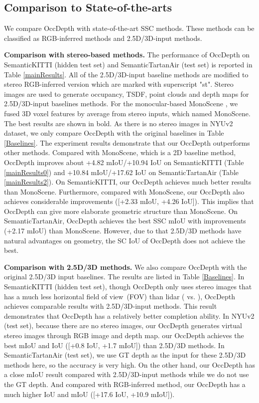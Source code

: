 \documentclass{article}
\begin{document}
	\subsection{Comparison to State-of-the-arts}
	\label{ComparisonSOTA}
	We compare OccDepth with state-of-the-art SSC methods. These methods can be classified as RGB-inferred methods and 2.5D/3D-input methods.

 	\textbf{Comparison with stereo-based methods.} The performance of OccDepth on SemanticKITTI (hidden test set) and SemanticTartanAir (test set) is reported in Table \ref{mainResults}. All of the 2.5D/3D-input baseline methods are modified to stereo RGB-inferred version which are marked with superscript "st". Stereo images are used to generate occupancy, TSDF, point clouds and depth maps for 2.5D/3D-input baselines methods. For the monocular-based MonoScene \cite{Cao_2022_CVPR}, we fused 3D voxel features by average from stereo inputs, which named MonoScene. The best results are shown in bold. As there is no stereo images in NYUv2 dataset, we only compare  OccDepth with the original baselines in Table \ref{Baselines}.
	The experiment results demonstrate that our OccDepth outperforms other methods. Compared with MonoScene, which is a 2D baseline method, OccDepth improves about +4.82 mIoU/+10.94 IoU on SemanticKITTI (Table \ref{mainResults0}) and +10.84 mIoU/+17.62 IoU on SemanticTartanAir (Table \ref{mainResults2}). On SemanticKITTI, our OccDepth achieves much better results than MonoScene. Furthermore, compared with MonoScene, our OccDepth also achieves considerable improvements ([+2.33 mIoU, +4.26 IoU]). This implies that OccDepth can give more elaborate geometric structure than MonoScene. On SemanticTartanAir, OccDepth achieves the best SSC mIoU with improvements (+2.17 mIoU) than MonoScene. However, due to that 2.5D/3D methods have natural advantages on geometry, the SC IoU of OccDepth does not achieve the best. 
	
	\textbf{Comparison with 2.5D/3D methods.} We also compare OccDepth with the original 2.5D/3D input baselines. The results are listed in Table \ref{Baselines}. In SemanticKITTI (hidden test set), though OccDepth only uses stereo images that has a much less horizontal field of view~(FOV) than lidar ( vs. ), OccDepth achieves comparable results with 2.5D/3D-input methods. This result demonstrates that OccDepth has a relatively better completion ability. In NYUv2 (test set), because there are no stereo images, our OccDepth generates virtual stereo images through RGB image and depth map. our OccDepth achieves the best mIoU and IoU ([+0.8 IoU, +1.7 mIoU]) than 2.5D/3D methods. 
	In SemanticTartanAir (test set), we use GT depth as the input for these 2.5D/3D methods here, so the accuracy is very high. On the other hand, our OccDepth has a close mIoU result compared with 2.5D/3D-input methods while we do not use the GT depth. And compared with RGB-inferred method, our OccDepth has a much higher IoU and mIoU ([+17.6 IoU, +10.9 mIoU]).  
\end{document}
